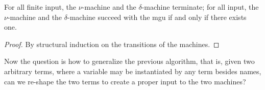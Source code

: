 \documentclass[a4paper,UKenglish]{lipics-v2016}
\begin{document}
\begin{lemma}\label{lemma:numachine}
 For all finite input, the $\nu$-machine and the $\delta$-machine
 terminate; for all input, the $\nu$-machine and the $\delta$-machine
 succeed with the mgu if and only if there exists one.
\end{lemma}
\begin{proof}
    By structural induction on the transitions of the machines.
\end{proof}


Now the question is how to generalize the previous algorithm, that is,
given two arbitrary terms, where a variable may be instantiated by any
term besides names, can we re-shape the two terms to create a proper
input to the two machines?


\end{document}
